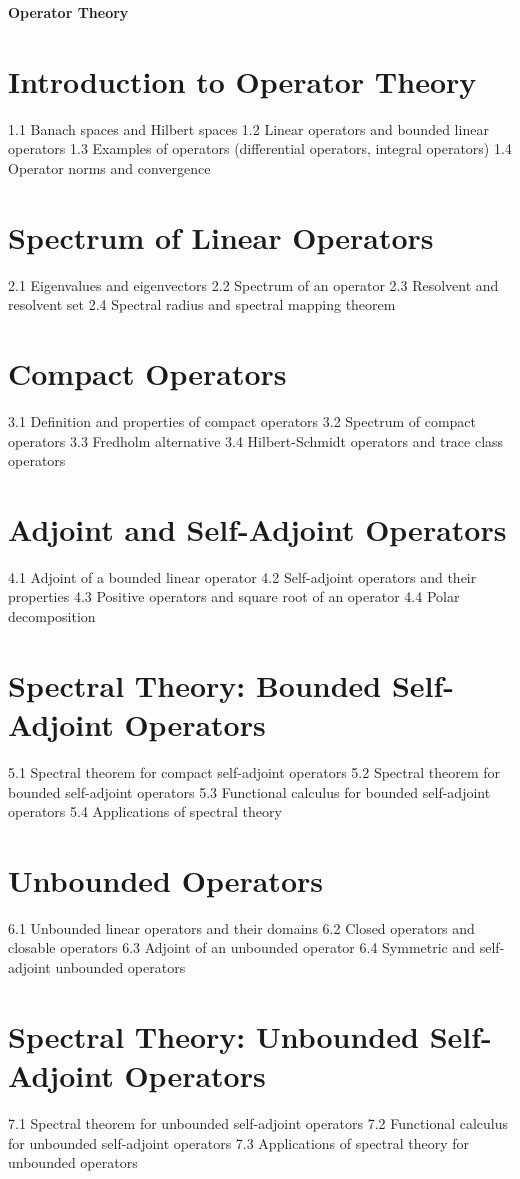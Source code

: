 {\LARGE \bf{Operator Theory}}
\section{Introduction to Operator Theory}
1.1 Banach spaces and Hilbert spaces
1.2 Linear operators and bounded linear operators
1.3 Examples of operators (differential operators, integral operators)
1.4 Operator norms and convergence
\section{Spectrum of Linear Operators}
2.1 Eigenvalues and eigenvectors
2.2 Spectrum of an operator
2.3 Resolvent and resolvent set
2.4 Spectral radius and spectral mapping theorem
\section{Compact Operators}
3.1 Definition and properties of compact operators
3.2 Spectrum of compact operators
3.3 Fredholm alternative
3.4 Hilbert-Schmidt operators and trace class operators
\section{Adjoint and Self-Adjoint Operators}
4.1 Adjoint of a bounded linear operator
4.2 Self-adjoint operators and their properties
4.3 Positive operators and square root of an operator
4.4 Polar decomposition
\section{Spectral Theory: Bounded Self-Adjoint Operators}
5.1 Spectral theorem for compact self-adjoint operators
5.2 Spectral theorem for bounded self-adjoint operators
5.3 Functional calculus for bounded self-adjoint operators
5.4 Applications of spectral theory
\section{Unbounded Operators}
6.1 Unbounded linear operators and their domains
6.2 Closed operators and closable operators
6.3 Adjoint of an unbounded operator
6.4 Symmetric and self-adjoint unbounded operators
\section{Spectral Theory: Unbounded Self-Adjoint Operators}
7.1 Spectral theorem for unbounded self-adjoint operators
7.2 Functional calculus for unbounded self-adjoint operators
7.3 Applications of spectral theory for unbounded operators
